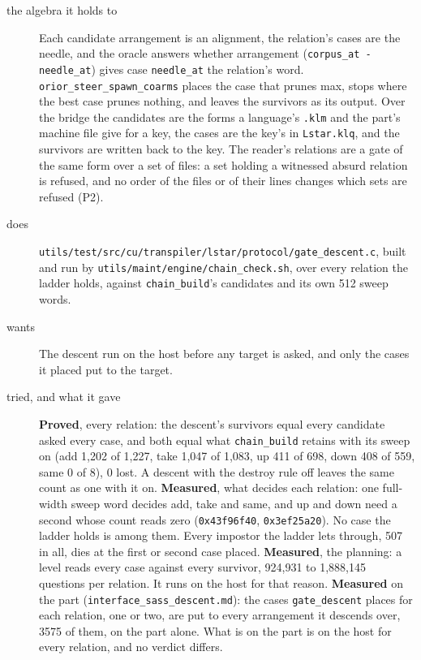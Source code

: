 \begin{description}
\item[{the algebra it holds to}] Each candidate arrangement is an alignment, the relation's cases are the needle, and the oracle answers whether arrangement (\texttt{corpus\_\allowbreak{}at -\allowbreak{} needle\_\allowbreak{}at}) gives case \texttt{needle\_\allowbreak{}at} the relation's word. \texttt{orior\_\allowbreak{}steer\_\allowbreak{}spawn\_\allowbreak{}coarms} places the case that prunes max, stops where the best case prunes nothing, and leaves the survivors as its output. Over the bridge the candidates are the forms a language's \texttt{.\allowbreak{}klm} and the part's machine file give for a key, the cases are the key's in \texttt{Lstar.\allowbreak{}klq}, and the survivors are written back to the key. The reader's relations are a gate of the same form over a set of files: a set holding a witnessed absurd relation is refused, and no order of the files or of their lines changes which sets are refused (P2).
\item[{does}] \texttt{utils/\allowbreak{}test/\allowbreak{}src/\allowbreak{}cu/\allowbreak{}transpiler/\allowbreak{}lstar/\allowbreak{}protocol/\allowbreak{}gate\_\allowbreak{}descent.\allowbreak{}c}, built and run by \texttt{utils/\allowbreak{}maint/\allowbreak{}engine/\allowbreak{}chain\_\allowbreak{}check.\allowbreak{}sh}, over every relation the ladder holds, against \texttt{chain\_\allowbreak{}build}'s candidates and its own 512 sweep words.
\item[{wants}] The descent run on the host before any target is asked, and only the cases it placed put to the target.
\item[{tried, and what it gave}] \textbf{Proved}, every relation: the descent's survivors equal every candidate asked every case, and both equal what \texttt{chain\_\allowbreak{}build} retains with its sweep on (add 1,202 of 1,227, take 1,047 of 1,083, up 411 of 698, down 408 of 559, same 0 of 8), 0 lost. A descent with the destroy rule off leaves the same count as one with it on. \textbf{Measured}, what decides each relation: one full-width sweep word decides add, take and same, and up and down need a second whose count reads zero (\texttt{0x43f96f40}, \texttt{0x3ef25a20}). No case the ladder holds is among them. Every impostor the ladder lets through, 507 in all, dies at the first or second case placed. \textbf{Measured}, the planning: a level reads every case against every survivor, 924,931 to 1,888,145 questions per relation. It runs on the host for that reason. \textbf{Measured} on the part (\texttt{interface\_\allowbreak{}sass\_\allowbreak{}descent.\allowbreak{}md}): the cases \texttt{gate\_\allowbreak{}descent} places for each relation, one or two, are put to every arrangement it descends over, 3575 of them, on the part alone. What is on the part is on the host for every relation, and no verdict differs.

\end{description}
